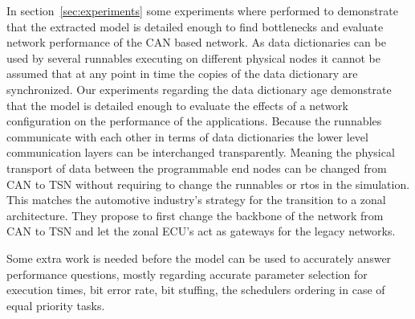 In section~\ref{sec:experiments} some experiments where performed to demonstrate that the extracted model is detailed enough to find bottlenecks and evaluate network performance of the CAN based network. As data dictionaries can be used by several runnables executing on different physical nodes it cannot be assumed that at any point in time the copies of the data dictionary are synchronized. Our experiments regarding the data dictionary age demonstrate that the model is detailed enough to evaluate the effects of a network configuration on the performance of the applications. Because the runnables communicate with each other in terms of data dictionaries the lower level communication layers can be interchanged transparently. Meaning the physical transport of data between the programmable end nodes can be changed from CAN to TSN without requiring to change the runnables or rtos in the simulation. This matches the automotive industry's strategy for the transition to a zonal architecture. They propose to first change the backbone of the network from CAN to TSN and let the zonal ECU's act as gateways for the legacy networks.

Some extra work is needed before the model can be used to accurately answer performance questions, mostly regarding accurate parameter selection for execution times, bit error rate, bit stuffing, the schedulers ordering in case of equal priority tasks.

